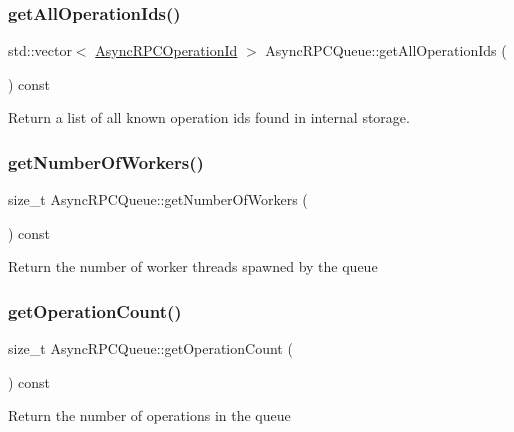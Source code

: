 \subsubsection{\texorpdfstring{get\+All\+Operation\+Ids()}{getAllOperationIds()}}
{\footnotesize\ttfamily std\+::vector$<$ \mbox{\hyperlink{asyncrpcoperation_8h_a1fb3337bad8503e6f6823aa1bcd7191c}{Async\+R\+P\+C\+Operation\+Id}} $>$ Async\+R\+P\+C\+Queue\+::get\+All\+Operation\+Ids (\begin{DoxyParamCaption}{ }\end{DoxyParamCaption}) const}

Return a list of all known operation ids found in internal storage. \mbox{\label{class_async_r_p_c_queue_a0ee8726139e10e2421bffa22509fa790}} 
\subsubsection{\texorpdfstring{get\+Number\+Of\+Workers()}{getNumberOfWorkers()}}
{\footnotesize\ttfamily size\+\_\+t Async\+R\+P\+C\+Queue\+::get\+Number\+Of\+Workers (\begin{DoxyParamCaption}{ }\end{DoxyParamCaption}) const}

Return the number of worker threads spawned by the queue \mbox{\label{class_async_r_p_c_queue_ab170c29699beeb0f95791953ce2c66d3}} 
\subsubsection{\texorpdfstring{get\+Operation\+Count()}{getOperationCount()}}
{\footnotesize\ttfamily size\+\_\+t Async\+R\+P\+C\+Queue\+::get\+Operation\+Count (\begin{DoxyParamCaption}{ }\end{DoxyParamCaption}) const}

Return the number of operations in the queue \mbox{\label{class_async_r_p_c_queue_a4d8d32008c611e4cd7ba122a6dda28c6}} 
